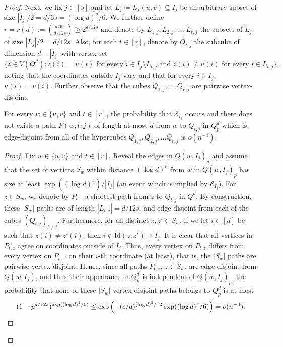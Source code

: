 \documentclass[10pt,a4paper]{amsart}
\def\Id{\mathrm{Id}}
\begin{document}
\begin{proof}
Next, we fix $j\in [s]$ and let $L_j\coloneqq L_j(u,v)\subseteq I_j$ be an arbitrary subset of size $|I_j|/2=d/6s=(\log d)^2/6$.
We further define $r=r(d):= \binom{d/6s}{d/12s}\ge 2^{d/12s}$ and denote by $L_{1,j},L_{2,j},...,L_{r,j}$ the subsets of $L_j$ of size $|L_j|/2=d/12s$. 
Also, for each $t\in [r]$, denote by $Q_{t,j}$ the subcube of dimension $d-|I_j|$ with vertex set 
\[\{z\in V(Q^d): z(i)=u(i) \text{ for every }i\in I_j\setminus L_{t,j} \text{ and } z(i)\neq u(i) \text{ for every } i\in L_{t,j}\},\]
noting that the coordinates outside $I_j$ vary and that for every $i\in I_j$, $u(i)=v(i)$. Further observe that the cubes $Q_{1,j},\ldots,Q_{r,j}$ are pairwise vertex-disjoint.

\begin{claim}\label{claim:join_vertices_tocubes}
For every $w\in \{u,v\}$ and $t\in [r]$, the probability that $\mathcal{E}_{I_j}$ occurs and there does not exists a path $P(w,t,j)$ of length at most $d$ from $w$ to $Q_{t,j}$ in $Q^d_p$ which is edge-disjoint from all of the hypercubes $Q_{1,j},Q_{2,j},\ldots Q_{r,j}$ is $o(n^{-4})$.
\end{claim}
\begin{proof}
Fix $w\in \{u,v\}$ and $t\in [r]$.
Reveal the edges in $Q(w,I_j)_p$ and assume that the set of vertices $S_w$ within distance $(\log d)^5$ from $w$ in $Q(w,I_j)_p$ has size at least $\exp((\log d)^4)/|I_j|$ (an event which is implied by $\mathcal{E}_{I_j}$). 
For $z\in S_w$, we denote by $P_{t,z}$ a shortest path from $z$ to $Q_{t,j}$ in $Q^d$. 
By construction, these $|S_w|$ paths are of length $|L_{t,j}|=d/12s$, and edge-disjoint from each of the cubes $(Q_{l,j})_{l\neq t}$. Furthermore, for all distinct $z,z'\in S_w$, if we let $i\in [d]$ be such that $z(i)\neq z'(i)$, then $i\notin \Id(z,z')\supset I_j$. It is clear that all vertices in $P_{t,z}$ agree on coordinates outside of $I_j$. Thus, every vertex on $P_{t,z}$ differs from every vertex 
on $P_{t,z'}$ on their $i$-th coordinate (at least), that is, the $|S_w|$ paths are pairwise vertex-disjoint. Hence, since all paths $P_{t,z}$, $z\in S_w$, are edge-disjoint from $Q(w,I_j)$, and thus their appearance in $Q_p^d$ is independent of $Q(w,I_j)_p$, the probability that none of these $|S_w|$ vertex-disjoint paths belongs to $Q_p^d$ is at most
\begin{equation*}
    (1-p^{d/12s})^{\exp((\log d)^4/6)}\leq \exp\left(-(c/d)^{(\log d)^2/12}\exp((\log d)^4/6)\right) = o(n^{-4}).\qedhere
\end{equation*}
\end{proof}


\end{proof}
\end{document}
